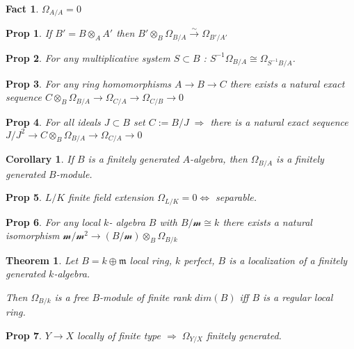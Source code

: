 \documentclass[a4paper, 12pt]{article}
\newcommand{\ca}[1]{\mathcal{#1}}
\newtheorem*{prop}{Prop}
\newtheorem*{fact}{Fact}
\newtheorem*{thm}{Theorem}
\newtheorem*{cor}{Corollary}
\begin{document}
	\begin{fact}
		$ \Omega_{A/A} = 0 $
	\end{fact}
	
	\begin{prop}
		If $ B' = B\otimes_A A' $ then $ B' \otimes_B \Omega_{B/A} \xrightarrow{\sim} \Omega_{B'/A'} $
	\end{prop}
	
	\begin{prop}
		For any multiplicative system $ S \subset B $ : $ S^{-1} \Omega_{B/A} \cong \Omega_{S^{-1}B/A} $.
	\end{prop}
	
	\begin{prop}
		For any ring homomorphisms $ A \rightarrow B \rightarrow C $ there exists a natural exact sequence $ C \otimes_B \Omega_{B/A} \rightarrow \Omega_{C/A} \rightarrow \Omega_{C/B} \rightarrow 0 $
	\end{prop}
	
	\begin{prop}
		For all ideals $ J \subset B $ set $ C := B/J  \; \Rightarrow $ there is a natural exact sequence $ J/J^2 \rightarrow C \otimes_B \Omega_{B/A} \rightarrow \Omega_{C/A} \rightarrow 0 $
	\end{prop}
	
	\begin{cor}
		If $ B $ is a finitely generated $ A $-algebra, then $ \Omega_{B/A}  $ is a finitely generated $ B $-module.
	\end{cor}
	
	\begin{prop}
		$ L/K $ finite field extension $ \Omega_{L/K} = 0 \Leftrightarrow  $ separable.
	\end{prop}
	
	\begin{prop}
		For any local $ k $- algebra $ B $ with $ B/\ca{m} \cong k $ there exists a natural isomorphism $ \ca{m}/\ca{m}^2 \rightarrow (B/\ca{m}) \otimes_B \Omega_{B/k} $
	\end{prop}
	
	\begin{thm}
		Let $ B = k \oplus \mathfrak{m} $ local ring, $ k $ perfect, $ B $ is a localization of a finitely generated $ k $-algebra.
		
		Then $ \Omega_{B/k} $ is a free $ B $-module of finite rank $ dim(B) $ iff $ B  $ is a regular local ring.
	\end{thm}
	
	\begin{prop}
		$ Y \rightarrow X $ locally of finite type $ \Rightarrow \; \Omega_{Y/X} $ finitely generated.
	\end{prop}
	
\end{document}
